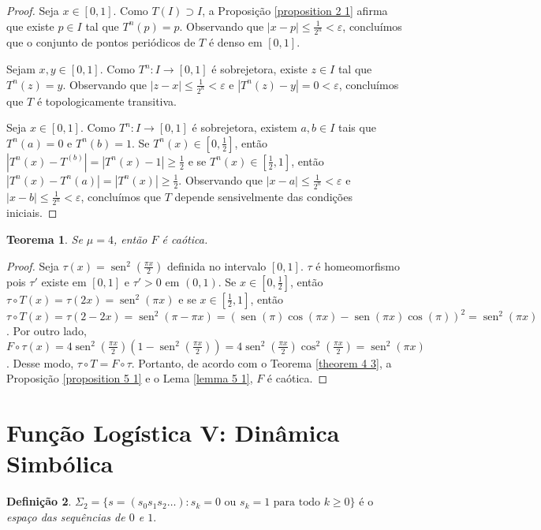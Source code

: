 \documentclass[a4paper, 12pt]{article}
\theoremstyle{definition}
\newtheorem{definition}{Definição}[section]
\theoremstyle{plain}
\theoremstyle{plain}
\theoremstyle{plain}
\newtheorem{theorem}[definition]{Teorema}
\theoremstyle{definition}
\theoremstyle{remark}
\DeclareMathOperator{\sen}{sen}
\begin{document}
\begin{proof}
Seja $x \in [0,1]$. Como $T(I) \supset I$, a Proposição \ref{proposition 2 1} afirma que existe $p \in I$ tal que $T^n(p) = p$. Observando que $|x-p| \leq \frac{1}{2^n} < \varepsilon$, concluímos que o conjunto de pontos periódicos de $T$ é denso em $[0,1]$.

Sejam $x, y \in [0,1]$. Como $T^n: I \to [0,1]$ é sobrejetora, existe $z \in I$ tal que $T^n(z) = y$. Observando que $|z - x| \leq \frac{1}{2^n} < \varepsilon$ e $|T^n(z) - y| = 0 < \varepsilon$, concluímos que $T$ é topologicamente transitiva.

Seja $x \in [0,1]$.  Como $T^n: I \to [0,1]$ é sobrejetora, existem $a, b \in I$ tais que $T^n(a) = 0$ e $T^n(b) = 1$. Se $T^n(x) \in [0, \frac{1}{2}]$, então $|T^n(x) - T^(b)| = |T^n(x) - 1| \geq \frac{1}{2}$ e se $T^n(x) \in [\frac{1}{2}, 1]$, então $|T^n(x) - T^n(a)| = |T^n(x)| \geq \frac{1}{2}$. Observando que $|x - a| \leq \frac{1}{2^n} < \varepsilon$ e $|x - b| \leq \frac{1}{2^n} < \varepsilon$, concluímos que $T$ depende sensivelmente das condições iniciais.
\end{proof}

\begin{theorem}
Se $\mu = 4$, então $F$ é caótica.
\end{theorem}

\begin{proof}
Seja $\tau(x) = \sen^2\left(\frac{\pi x}{2}\right)$ definida no intervalo $ [0,1]$. $\tau$ é homeomorfismo pois $\tau'$ existe em $[0,1]$ e $\tau' > 0$ em $(0,1)$. Se $x \in \left[0, \frac{1}{2}\right]$, então $\tau \circ T(x) = \tau(2x) = \sen^2(\pi x)$ e se $x \in \left[\frac{1}{2}, 1\right]$, então $\tau \circ T(x) = \tau(2 - 2x) = \sen^2(\pi- \pi x) = (\sen(\pi)\cos(\pi x) - \sen(\pi x)\cos(\pi))^2 = \sen^2(\pi x)$. Por outro lado, $F \circ \tau(x) = 4\sen^2\left(\frac{\pi x}{2}\right)(1 - \sen^2\left(\frac{\pi x}{2}\right)) = 4\sen^2\left(\frac{\pi x}{2}\right)\cos^2\left(\frac{\pi x}{2}\right) = \sen^2(\pi x)$. Desse modo, $\tau \circ T = F \circ \tau$. Portanto, de acordo com o Teorema \ref{theorem 4 3}, a Proposição \ref{proposition 5 1} e o Lema \ref{lemma 5 1}, $F$ é caótica.
\end{proof}

\section{Função Logística V: Dinâmica Simbólica}

\begin{definition}
$\Sigma_2 = \{s = (s_0s_1s_2\dots) : s_k = 0 \textrm{ ou } s_k = 1 \textrm{ para todo } k\geq 0\}$ é o \textit{espaço das sequências de $0$ e $1$}.
\end{definition}
\end{document}
